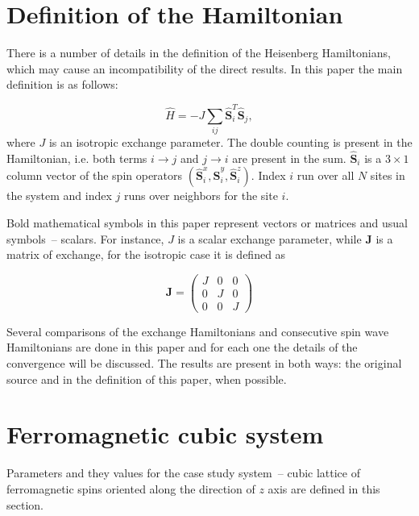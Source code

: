 \documentclass[a4paper,12pt]{article}
\begin{document}
    \section{Definition of the Hamiltonian}

        There is a number of details in the definition of the Heisenberg Hamiltonians, which may cause an incompatibility of the direct results. 
        In this paper the main definition is as follows:

        \begin{equation}
            \hat{H} = -J \sum_{ij} \hat{\mathbf{S}}_i^T \hat{\mathbf{S}}_j,
            \label{eq:hh-main}
        \end{equation}
        where $J$ is an isotropic exchange parameter. The double counting is present in the Hamiltonian, i.e. both terms $i\rightarrow j$ and $j \rightarrow i$ are present in the sum. 
        $\hat{\mathbf{S}}_i$ is a $3\times1$ column vector of the spin operators $(\hat{\mathbf{S}}_i^x, \hat{\mathbf{S}}_i^y, \hat{\mathbf{S}}_i^z)$. 
        Index $i$ run over all $N$ sites in the system and index $j$ runs over neighbors for the site $i$. 

        Bold mathematical symbols in this paper represent vectors or matrices and usual symbols~-- scalars. For instance, $J$ is a scalar exchange parameter, while $\mathbf{J}$ is a matrix of exchange, 
        for the isotropic case it is defined as

        \begin{equation}
            \mathbf{J} =
            \begin{pmatrix}
                J & 0 & 0 \\
                0 & J & 0 \\
                0 & 0 & J
            \end{pmatrix}
        \end{equation}

        Several comparisons of the exchange Hamiltonians and consecutive spin wave Hamiltonians are done in this paper and for each one the details of the convergence will be discussed. 
        The results are present in both ways: the original source and in the definition of this paper, when possible.

    \section{Ferromagnetic cubic system}

        Parameters and they values for the case study system~-- 
        cubic lattice of ferromagnetic spins oriented along the direction of $z$ axis are defined in this section.
\end{document}
